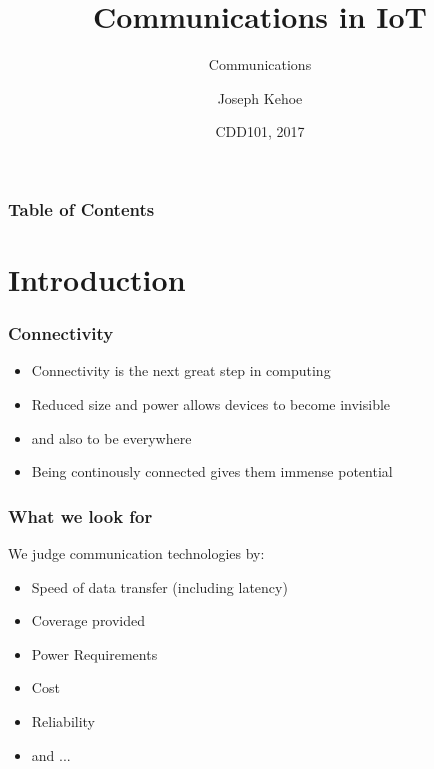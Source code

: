 \documentclass{beamer}
\title[Communications] %
{Communications in IoT}
\subtitle{Communications}
\author[Dr. Joseph Kehoe] %
{Joseph Kehoe\inst{1}}
\institute[IT Carlow] %
{
	\inst{1}%
	Department of Computing and Networking\\
	Institute of Technology Carlow
}
\date[ITC 2017] %
{CDD101, 2017}
\begin{document}
 
\frame{\titlepage}
 
 \begin{frame}
 	\frametitle{Table of Contents}
 	\tableofcontents
 \end{frame}
 
 
 \section{Introduction}
  \begin{frame}
  	\frametitle{Connectivity}
  	\begin{itemize}
  	\item Connectivity is the next great step in computing
  	\item Reduced size and power allows devices to become invisible
  	\item and also to be everywhere
  	\item Being continously connected gives them immense potential
  	\end{itemize}
  \end{frame}
     \begin{frame}
  	\frametitle{What we look for}
  	We judge communication technologies by:
  	\begin{itemize}
  	\item Speed of data transfer (including latency)
  	\item Coverage provided
  	\item Power Requirements
  	\item Cost
  	\item Reliability
  	\item and ...
  	\end{itemize}
  \end{frame}
\end{document}
